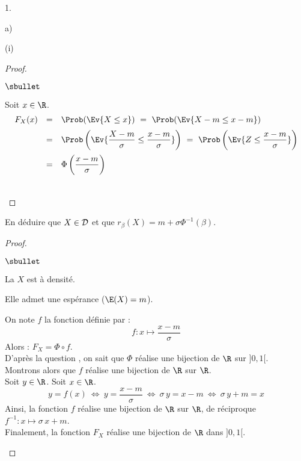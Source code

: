 \documentclass[11pt]{article}%
\begin{document}
\begin{noliste}{1.}
\begin{noliste}{a)}
\begin{nonoliste}{(i)}
\begin{proof}
\begin{noliste}{$\sbullet$}
	  

	  
	  \item Soit $x\in \R$.
	  \[
	  \begin{array}{rcl}
	    F_X(x) &=& \Prob(\Ev{X \leq x}) \ = \ \Prob(\Ev{
	    X-m \leq x-m})
	    \\[.2cm]
	    &=& \Prob\left(\Ev{\dfrac{X-m}{\sigma} \leq 
	    \dfrac{x-m}{\sigma}}\right) \ = \ \Prob\left(\Ev{
	    Z \leq \dfrac{x-m}{\sigma}}\right)
	    \\[.4cm]
	    &=& \Phi \left(\dfrac{x-m}{\sigma}\right)
	  \end{array}
	  \]
        \end{noliste}
        
        
          
          
          
          ~\\[-1.4cm]
      \end{proof}

      
      \item En déduire que $X \in {\cal D}$ et que 
      $r_\beta(X)=m+\sigma \Phi^{-1}(\beta)$.
      
      \begin{proof}~
        \begin{noliste}{$\sbullet$}
	  \item La \var $X$ est à densité.
	  \item Elle admet une espérance ($\E(X)=m$).
	  \item On note $f$ la fonction définie par : 
	  \[
	    f : x \mapsto \dfrac{x-m}{\sigma}
	  \]
	  Alors : $F_X=\Phi \circ f$.\\
	  D'après la question , on sait que 
	  $\Phi$ réalise une bijection de $\R$ sur $]0,1[$.\\
	  Montrons alors que $f$ réalise une bijection de $\R$ sur 
	  $\R$.\\
	  Soit $y\in \R$. Soit $x\in\R$.
	  \[
	    y=f(x) \ \Leftrightarrow \ y = \dfrac{x-m}{\sigma}
	    \ \Leftrightarrow \ \sigma \, y = x-m \ 
	    \Leftrightarrow \ \sigma \, y+m = x
	  \]
	  Ainsi, la fonction $f$ réalise une bijection de $\R$ sur 
	  $\R$, de 
	  réciproque $f^{-1} : x \mapsto \sigma \, x+m$.\\
	  Finalement, la fonction $F_X$ réalise une bijection de 
	  $\R$ dans $]0,1[$.
	  

\end{noliste}
\end{proof}
\end{nonoliste}
\end{noliste}
\end{noliste}
\end{document}
